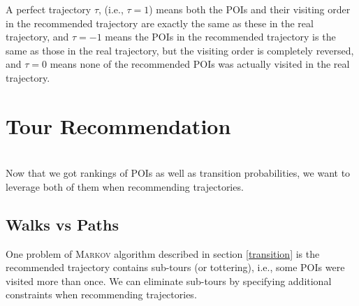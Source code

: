 A perfect trajectory $\tau$, (i.e., $\tau = 1$) means both the POIs and their visiting order in the
recommended trajectory are exactly the same as these in the real trajectory,
and $\tau = -1$ means the POIs in the recommended trajectory is the same as those in the real trajectory,
but the visiting order is completely reversed,
and $\tau = 0$ means none of the recommended POIs was actually visited in the real trajectory.


\section{Tour Recommendation}
\label{recommendation}

 \\
Now that we got rankings of POIs as well as transition probabilities,
we want to leverage both of them when recommending trajectories.

\subsection{Walks vs Paths}
\label{walkpath}
%
One problem of \textsc{Markov} algorithm described in section \ref{transition} is the recommended
trajectory contains sub-tours (or tottering), i.e., some POIs were visited more than once.
We can eliminate sub-tours by specifying additional constraints when recommending trajectories.

